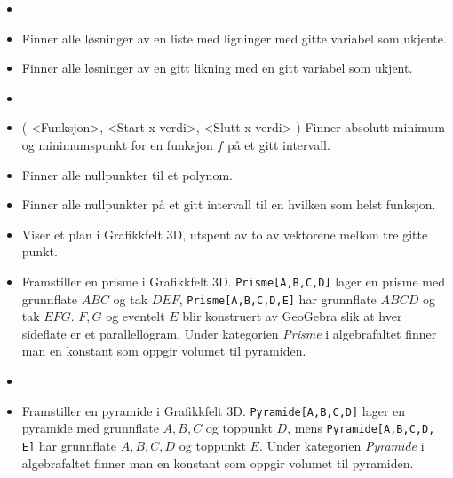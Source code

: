 \begin{itemize}
\item {}

\item 
{}
{Finner alle løsninger av en liste med ligninger med gitte variabel som ukjente.}

\item {}
{Finner alle løsninger av en gitt likning med en gitt variabel som ukjent.}

\item {}

\item {}( <Funksjon>, <Start x-verdi>, <Slutt x-verdi> ) {Finner absolutt minimum og minimumspunkt for en funksjon $ f $ på et gitt intervall.}

\item {}
{Finner alle nullpunkter til et polynom.}

\item {}
{Finner alle nullpunkter på et gitt intervall til en hvilken som helst funksjon.}

\item {}
{Viser et plan i Grafikkfelt 3D, utspent av to av vektorene mellom tre gitte punkt.}

\item {}
{Framstiller en prisme i Grafikkfelt 3D. {\tt Prisme[A,B,C,D]} lager en prisme med grunnflate $ ABC $ og tak $ DEF $, {\tt Prisme[A,B,C,D,E]} har grunnflate $ ABCD $ og tak $ EFG $. $ F, G$ og eventelt $ E $ blir konstruert av GeoGebra slik at hver sideflate er et parallellogram. Under kategorien \textsl{Prisme} i algebrafaltet finner man en konstant som oppgir volumet til pyramiden.}

\item {}

\item {}
{Framstiller en pyramide i Grafikkfelt 3D. {\tt Pyramide[A,B,C,D]} lager en pyramide med grunnflate ${ A, B, C} $ og toppunkt $ D $, mens {\tt Pyramide[A,B,C,D, E]} har grunnflate ${ A, B, C, D }$ og toppunkt $ E $. Under kategorien \textsl{Pyramide} i algebrafaltet finner man en konstant som oppgir volumet til pyramiden.}


\end{itemize}
